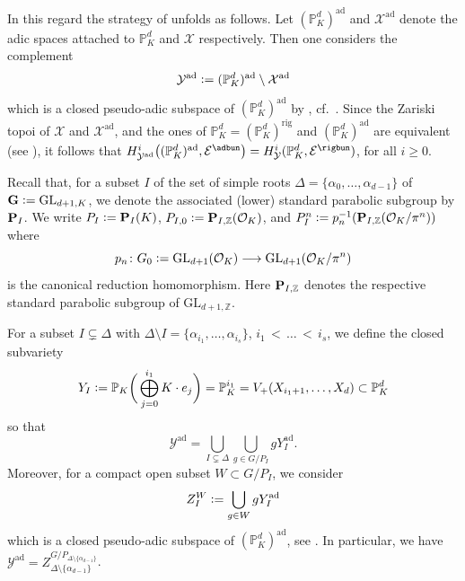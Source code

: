 \documentclass[a4paper, reqno, 10pt]{amsart}
\theoremstyle{definition}
\numberwithin{equation}{section}
\newcommand{\ad}{{\mathrm{ad}}}
\newcommand{\defeq}{\vcentcolon=}
\newcommand{\GL}{{\mathrm{GL}}}
\newcommand{\lra}{\longrightarrow}
\newcommand{\rig}{{\mathrm{rig}}}
\newcommand{\BP}{{\mathbb {P}}}
\newcommand{\BZ}{{\mathbb {Z}}}
\newcommand{\CE}{{\mathcal {E}}}
\newcommand{\CO}{{\mathcal {O}}}
\newcommand{\CX}{{\mathcal {X}}}
\newcommand{\CY}{{\mathcal {Y}}}
\newcommand{\bG}{{\mathrm{\bf G}}}
\newcommand{\bP}{{\mathrm{\bf P}}}
\newcommand{\unif}{{\pi}}
\begin{document}
In this regard the strategy of \cite{Orlik08EquivVBDrinfeldUpHalfSp} unfolds as follows.
Let $(\BP_K^d)^\ad$ and $\CX^\ad$ denote the adic spaces attached to $\BP_K^d$ and $\CX$ respectively.
Then one considers the complement
\begin{equation*}
	\CY^\ad \defeq (\BP_K^d)^\ad \setminus \CX^\ad
\end{equation*}
which is a closed pseudo-adic subspace of $(\BP_K^d)^\ad$ by \cite[Lemma 3.2]{Orlik05CohomPerDomRedGrpLocF}, cf.\ \cite[Ch.\ 1.10]{Huber96EtCohomAdSp}.
Since the Zariski topoi of $\CX$ and $\CX^\ad $, and the ones of $\BP_K^d = (\BP_K^d)^\rig$ and $(\BP_K^d)^\ad$ are equivalent (see \cite[Prop.\ 4.5 (i)]{Huber94GenFormalSchRigAnVar}),
it follows that $H^i_{\CY^\ad}\big((\BP_K^d)^\ad, \CE^\adbun \big) = H^i_{\CY}(\BP_K^d,\CE^\rigbun)$, for all $i\geq 0$.



Recall that, for a subset $I$ of the set of simple roots $\Delta = \{\alpha_0,\ldots,\alpha_{d-1} \}$ of $\bG \defeq \GL_{d+1,K}$, we denote the associated (lower) standard parabolic subgroup by $\bP_I$.
We write $P_I \defeq \bP_I(K)$, $P_{I,0} \defeq \bP_{I,\BZ} (\CO_K)$, and $P^n_I \defeq p^{-1}_n (\bP_{I,\BZ}(\CO_K/\unif^n))$ where
\begin{equation*}
	p_n \colon G_0 \defeq \GL_{d+1}(\CO_K) \lra \GL_{d+1} (\CO_K/\unif^n)
\end{equation*}
is the canonical reduction homomorphism.
Here $\bP_{I,\BZ}$ denotes the respective standard parabolic subgroup of $\GL_{d+1,\BZ}$.


For a subset $I \subsetneq \Delta$ with $\Delta\setminus I = \{\alpha_{i_1}, \ldots, \alpha_{i_s} \}$, $i_1{\,<\,}\ldots {\,<\,} i_s$, we define the closed subvariety
\begin{equation*}
	Y_I \defeq \BP_K \bigg( \bigoplus_{j=0}^{i_1} K \cdot e_j \bigg) = \BP_K^{i_1} = V_+ (X_{i_1 +1},\ldots, X_{d}) \subset \BP_K^d
\end{equation*}
so that
\begin{equation*}
	\CY^\ad = \bigcup_{I \subsetneq \Delta} \bigcup_{g \in G/P_I} g Y_I^\ad .
\end{equation*}
Moreover, for a compact open subset $W \subset G/P_I$, we consider
\begin{equation*}
	Z_I^W \defeq \bigcup_{g\in W} g Y_I^\ad
\end{equation*}
which is a closed pseudo-adic subspace of $(\BP_K^d)^\ad$, see \cite[Lemma 3.2]{Orlik05CohomPerDomRedGrpLocF}. 
In particular, we have $\CY^\ad = Z^{G/P_{\Delta\setminus\{\alpha_{d-1}\}}}_{\Delta\setminus\{\alpha_{d-1}\}}$.
\end{document}
